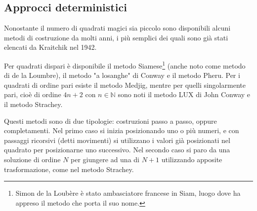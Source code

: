 \documentclass[italian,twoside,twocolumn]{article}
\begin{document}
\subsection{Approcci deterministici}
Nonostante il numero di quadrati magici sia piccolo  sono disponibili alcuni metodi di costruzione da molti anni, i più semplici dei quali sono già stati elencati da Kraitchik \cite{Krai:1942} nel 1942.

Per quadrati dispari è disponibile il metodo Siamese\footnote{Simon de la Loubère è stato ambasciatore francese in Siam, luogo dove ha appreso il metodo che porta il suo nome.} (anche noto come metodo di de la Loumbre), il metodo "a losanghe" di Conway e il metodo Pheru.
Per i quadrati di ordine pari esiste il metodo Medjig, mentre per quelli singolarmente pari, cioè di ordine $ 4n + 2 \text{ con } n \in \mathbb{N}$ sono noti il metodo LUX di John Conway e il metodo Strachey.

Questi metodi sono di due tipologie: costruzioni passo a passo, oppure completamenti. Nel primo caso si inizia posizionando uno o più numeri, e con passaggi ricorsivi (detti movimenti) si utilizzano i valori già posizionati nel quadrato per posizionarne uno successivo. Nel secondo caso si paro da una soluzione di ordine $ N $ per giungere ad una di $ N + 1 $ utilizzando apposite trasformazione, come nel metodo Strachey.
\end{document}
